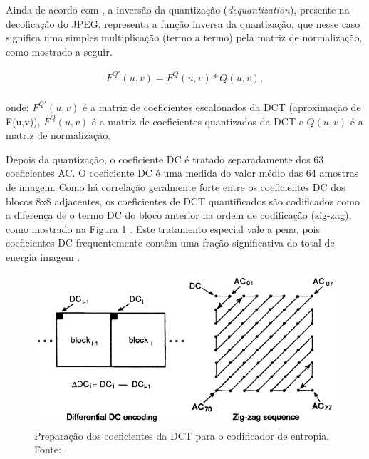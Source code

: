 			

Ainda de acordo com \cite{wallace1991jpeg}, a inversão da quantização (\textit{dequantization}), presente na decoficação do JPEG, representa a função inversa da quantização, que nesse caso significa uma simples multiplicação (termo a termo) pela matriz de normalização, como mostrado a seguir.
\vspace{-5mm}
\begin{center}
	\begin{equation}
		\begin{split}
			F^{Q'}(u,v) =F^Q(u,v) * Q(u,v), \\
		\end{split}
	\end{equation}
\end{center} 
onde:
			$F^{Q'}(u,v)$ é a matriz de coeficientes escalonados da DCT (aproximação de F(u,v)), 
			$F^Q(u,v)$ é a matriz de coeficientes quantizados da DCT e
			$Q(u,v)$ é a matriz de normalização.

Depois da quantização, o coeficiente DC é tratado separadamente dos 63 coeficientes AC. O coeficiente DC é uma medida do valor médio das 64 amostras de imagem. Como há correlação geralmente forte entre os coeficientes DC dos blocos 8x8 adjacentes, os coeficientes de DCT quantificados são codificados como a diferença de o termo DC do bloco anterior na ordem de codificação (zig-zag), como mostrado na Figura \ref{ZIG_ZAG} . Este tratamento especial vale a pena, pois coeficientes DC frequentemente contêm uma fração significativa do total de energia imagem \cite{wallace1991jpeg}.

\begin{figure}[h]
	\centering
	\includegraphics[scale=0.55]{figuras/ZIG-ZAG.png}
	\caption{Preparação dos coeficientes da DCT para o codificador de entropia. Fonte: \cite{wallace1991jpeg}.}
	\label{ZIG_ZAG}
\end{figure}

